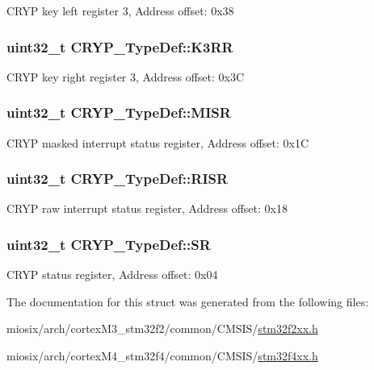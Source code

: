C\-R\-Y\-P key left register 3, Address offset\-: 0x38 \hypertarget{struct_c_r_y_p___type_def_a1c3230419aed39ab61263b87547cbc3e}{
\subsubsection[{K3\-R\-R}]{ uint32\-\_\-t C\-R\-Y\-P\-\_\-\-Type\-Def\-::\-K3\-R\-R}}\label{struct_c_r_y_p___type_def_a1c3230419aed39ab61263b87547cbc3e}
C\-R\-Y\-P key right register 3, Address offset\-: 0x3\-C \hypertarget{struct_c_r_y_p___type_def_aa807ff93c7ce98e9d13cbc52d245770f}{
\subsubsection[{M\-I\-S\-R}]{ uint32\-\_\-t C\-R\-Y\-P\-\_\-\-Type\-Def\-::\-M\-I\-S\-R}}\label{struct_c_r_y_p___type_def_aa807ff93c7ce98e9d13cbc52d245770f}
C\-R\-Y\-P masked interrupt status register, Address offset\-: 0x1\-C \hypertarget{struct_c_r_y_p___type_def_a04be1b2f14a37aed1deff4d57e6261dd}{
\subsubsection[{R\-I\-S\-R}]{ uint32\-\_\-t C\-R\-Y\-P\-\_\-\-Type\-Def\-::\-R\-I\-S\-R}}\label{struct_c_r_y_p___type_def_a04be1b2f14a37aed1deff4d57e6261dd}
C\-R\-Y\-P raw interrupt status register, Address offset\-: 0x18 \hypertarget{struct_c_r_y_p___type_def_a1d5cabaf9aea97e1b6f08352bc249094}{
\subsubsection[{S\-R}]{ uint32\-\_\-t C\-R\-Y\-P\-\_\-\-Type\-Def\-::\-S\-R}}\label{struct_c_r_y_p___type_def_a1d5cabaf9aea97e1b6f08352bc249094}
C\-R\-Y\-P status register, Address offset\-: 0x04 

The documentation for this struct was generated from the following files\-:\begin{DoxyCompactItemize}
\item 
miosix/arch/cortex\-M3\-\_\-stm32f2/common/\-C\-M\-S\-I\-S/\hyperlink{stm32f2xx_8h}{stm32f2xx.\-h}\item 
miosix/arch/cortex\-M4\-\_\-stm32f4/common/\-C\-M\-S\-I\-S/\hyperlink{stm32f4xx_8h}{stm32f4xx.\-h}\end{DoxyCompactItemize}
